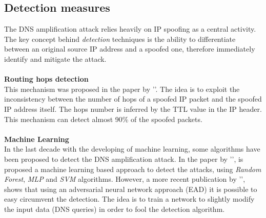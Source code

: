 \subsection{Detection measures}
The DNS amplification attack relies heavily on IP spoofing as a central activity. The key concept behind \textit{detection} techniques is the ability 
to differentiate between an original source IP address and a spoofed one, therefore immediately identify and mitigate the attack. \\
\\
\textbf{Routing hops detection}\\
This mechanism was proposed in the paper by '\cite{hopcount}'. The idea is to exploit the inconsistency between the
number of hops of a spoofed IP packet and the spoofed IP address itself. The hops number is inferred by the TTL value in the IP header.
This mechanism can detect almost 90\% of the spoofed packets.\\
\\
\textbf{Machine Learning}\\
In the last decade with the developing of machine learning, some algorithms have been proposed to detect the DNS amplification attack.
In the paper by '\cite{machinelearning}', is proposed a machine learning based approach to detect the attacks, using 
\textit{Random Forest}, \textit{MLP} and \textit{SVM} algorithms. However, a more recent publication by 
'\cite{createDNS}', shows that using an adversarial neural network approach (EAD) it is possible to easy circumvent the detection. 
The idea is to train a network to slightly modify the input data (DNS queries) in order to fool the detection algorithm.

